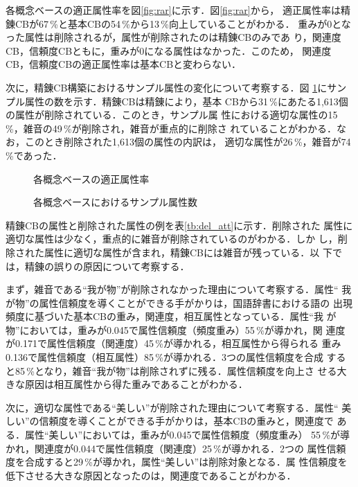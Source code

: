 各概念ベースの適正属性率を図\ref{fig:rar}に示す．図\ref{fig:rar}から，
適正属性率は精錬CBが67\,\%と基本CBの54\,\%から13\,\%向上していることがわかる．
重みが0となった属性は削除されるが，属性が削除されたのは精錬CBのみであ
り，関連度CB，信頼度CBともに，重みが0になる属性はなかった．このため，
関連度CB，信頼度CBの適正属性率は基本CBと変わらない．

次に，精錬CB構築におけるサンプル属性の変化について考察する．図
\ref{fig:cb_attnum}にサンプル属性の数を示す．精錬CBは精錬により，基本
CBから31\,\%にあたる1,613個の属性が削除されている．このとき，サンプル属
性における適切な属性の15\,\%，雑音の49\,\%が削除され，雑音が重点的に削除さ
れていることがわかる．なお，このとき削除された1,613個の属性の内訳は，
適切な属性が26\,\%，雑音が74\,\%であった．

\begin{figure}[ht]
  \begin{minipage}{.48\linewidth}
    \begin{center}
      \caption{各概念ベースの適正属性率}
      \label{fig:rar}
    \end{center}
  \end{minipage}
  \begin{minipage}{.48\linewidth}
    \begin{center}
      \caption{各概念ベースにおけるサンプル属性数}
      \label{fig:cb_attnum}
    \end{center}
  \end{minipage}
\end{figure}

精錬CBの属性と削除された属性の例を表\ref{tb:del_att}に示す．削除された
属性に適切な属性は少なく，重点的に雑音が削除されているのがわかる．しか
し，削除された属性に適切な属性が含まれ，精錬CBには雑音が残っている．以
下では，精錬の誤りの原因について考察する．

まず，雑音である“我が物”が削除されなかった理由について考察する．属性“
我が物”の属性信頼度を導くことができる手がかりは，国語辞書における語の
出現頻度に基づいた基本CBの重み，関連度，相互属性となっている．属性“我
が物”においては，重みが0.045で属性信頼度（頻度重み）55\,\%が導かれ，関
連度が0.171で属性信頼度（関連度）45\,\%が導かれる，相互属性から得られる
重み0.136で属性信頼度（相互属性）85\,\%が導かれる．3つの属性信頼度を合成
すると85\,\%となり，雑音“我が物”は削除されずに残る．属性信頼度を向上さ
せる大きな原因は相互属性から得た重みであることがわかる．

次に，適切な属性である“美しい”が削除された理由について考察する．属性“
美しい”の信頼度を導くことができる手がかりは，基本CBの重みと，関連度で
ある．属性“美しい”においては，重みが0.045で属性信頼度（頻度重み）
55\,\%が導かれ，関連度が0.044で属性信頼度（関連度）25\,\%が導かれる．2つの
属性信頼度を合成すると29\,\%が導かれ，属性“美しい”は削除対象となる．属
性信頼度を低下させる大きな原因となったのは，関連度であることがわかる．

